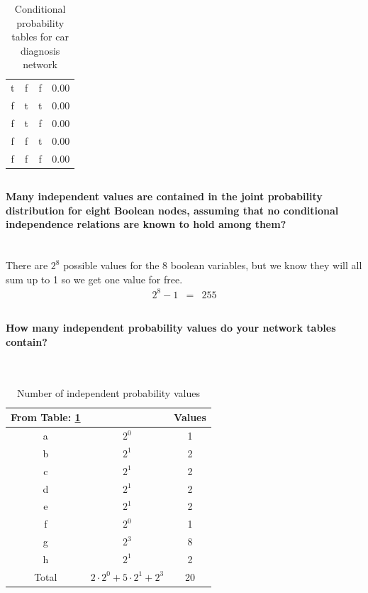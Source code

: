 \documentclass[	DIV=calc,%
				paper=a4,%
				fontsize=11pt,%
				twocolumn]{article}	 %
\begin{document}
\begin{table}[H]
{\begin{tabular}{|ccc|c|}
t & f  & f & 0.00 \\ 
f & t  & t & 0.00 \\ 
f & t  & f & 0.00 \\ 
f & f  & t & 0.00 \\ 
f & f  & f & 0.00 \\\hline
\end{tabular}}
\quad
{}
\caption{Conditional probability tables for car diagnosis network}
\label{table:first}
\end{table}

\subsection{}
\paragraph{Many independent values are contained in the joint probability distribution for eight Boolean nodes, assuming that no conditional independence relations are known to hold among them?}
~\\
There are $2^{8}$ possible values for the 8 boolean variables, but we know they will all sum up to 1 so we get one value for free.
\begin{eqnarray}
2^{8}-1 &=& 255
\end{eqnarray}
\newpage
\subsection{}
\paragraph{How many independent probability values do your network tables contain?}
~\\
\begin{table}[H]
\centering
\begin{tabular}{|c|c|c|}
\hline
From Table: \ref{table:first} &  & Values \\ \hline
a & $2^{0}$ & 1 \\
b & $2^{1}$ & 2 \\
c & $2^{1}$ & 2 \\
d & $2^{1}$ & 2 \\
e & $2^{1}$ & 2 \\
f & $2^{0}$ & 1 \\ 
g & $2^{3}$ & 8 \\
h & $2^{1}$ & 2 \\ \hline
Total & $2\cdot2^{0}+5\cdot2^{1}+2^{3}$ & 20 \\ \hline
\end{tabular}
\caption{Number of independent probability values}
\label{table:second}
\end{table}
\end{document}
